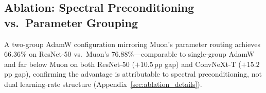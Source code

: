 \subsection{Ablation: Spectral Preconditioning vs.\ Parameter Grouping}
\label{sec:ablation}

A two-group AdamW configuration mirroring Muon's parameter routing achieves $66.36\%$ on ResNet-50 vs.\ Muon's $76.88\%$---comparable to single-group AdamW and far below Muon on both ResNet-50 ($+10.5$\,pp gap) and ConvNeXt-T ($+15.2$\,pp gap), confirming the advantage is attributable to spectral preconditioning, not dual learning-rate structure (Appendix~\ref{sec:ablation_details}).